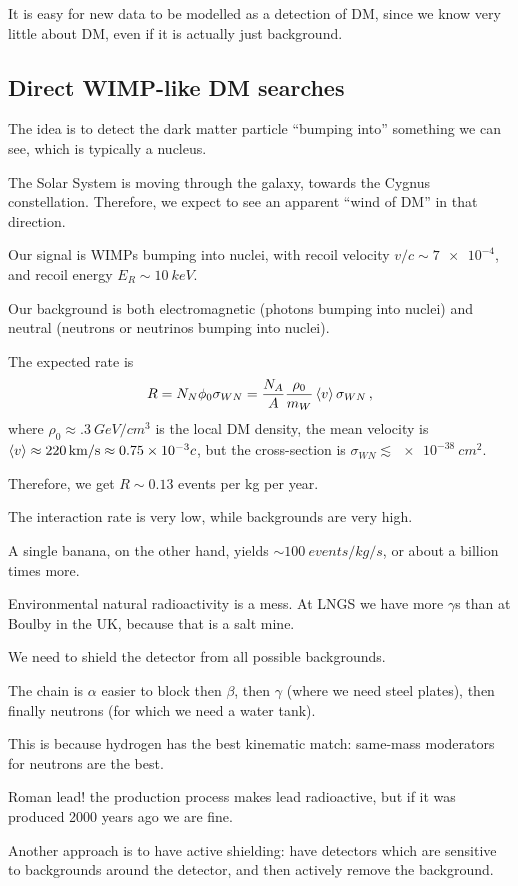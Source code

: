 \documentclass[main.tex]{subfiles}
\begin{document}
It is easy for new data to be modelled as a detection of DM, since we know very little about DM, even if it is actually just background.

\subsection{Direct WIMP-like DM searches}

The idea is to detect the dark matter particle ``bumping into'' something we can see, which is typically a nucleus. 

The Solar System is moving through the galaxy, towards the Cygnus constellation. 
Therefore, we expect to see an apparent ``wind of DM'' in that direction.

Our signal is WIMPs bumping into nuclei, with recoil velocity \(v/c \sim \num{7e-4}\), and recoil energy \(E_R \sim \SI{10}{keV}\).



Our background is both electromagnetic (photons bumping into nuclei) and neutral (neutrons or neutrinos bumping into nuclei). 

The expected rate is 
%
\begin{align}
R = N_N \phi_0 \sigma_{WN} = \frac{N_A}{A} \frac{\rho_0 }{m_W} \expval{v} \sigma_{WN}
\,,
\end{align}
%
where \(\rho_0 \approx \SI{.3}{GeV / cm^3}\) is the local DM density, the mean velocity is \(\expval{v} \approx \SI{220}{km/s} \approx \num{.75e-3} c\), but the cross-section is \(\sigma_{WN} \lesssim \SI{e-38}{cm^2}\).

Therefore, we get \(R \sim \num{0.13}\) events per kg per year. 

The interaction rate is very low, while backgrounds are very high.

A single banana, on the other hand, yields \(\sim \SI{100}{events/kg/s}\), or about a billion times more.


Environmental natural radioactivity is a mess. 
At LNGS we have more \(\gamma \)s than at Boulby in the UK, because that is a salt mine. 


We need to shield the detector from all possible backgrounds. 

The chain is \(\alpha \) easier to block then \(\beta \), then \(\gamma \) (where we need steel plates), then finally neutrons (for which we need a water tank). 

This is because hydrogen has the best kinematic match: same-mass moderators for neutrons are the best. 

Roman lead! the production process makes lead radioactive, 
but if it was produced 2000 years ago we are fine. 

Another approach is to have active shielding: have detectors which are sensitive to backgrounds around the detector, and then actively remove the background. 
\end{document}

